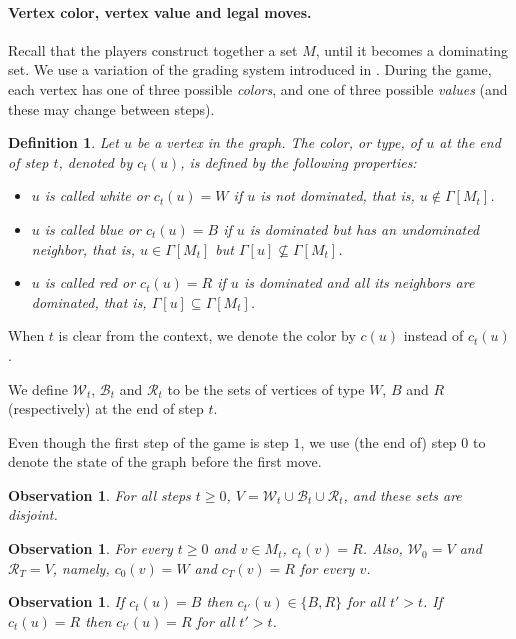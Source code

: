 \documentclass[11pt]{article}
\def\dnsitem{\vspace{-7pt}\item}
\newtheorem{definition}[theorem]{Definition}
\newtheorem{observation}[theorem]{Observation}
\theoremstyle{definition}
\begin{document}
\paragraph{Vertex color, vertex value and legal moves.}
Recall that the players construct together a set $M$, until it becomes a dominating set.
We use a variation of the grading system introduced in \cite{bujtas2015domination}.
During the game, each vertex has one of three possible \emph{colors}, and one of three possible \emph{values} 
(and these may change between steps).

\begin{definition}
Let $u$ be a vertex in the graph.
The \emph{color}, or \emph{type}, of $u$ at the end of step $t$, denoted by $c_t(u)$, is defined by the following properties:
\begin{itemize}
	\dnsitem $u$ is called \emph{white} or $c_t(u) = W$ if $u$ is not dominated, that is, $u \notin \Gamma[M_t]$.
	\dnsitem $u$ is called \emph{blue} or $c_t(u) = B$ if $u$ is dominated but has an undominated neighbor, that is, $u \in \Gamma[M_t]$ but $\Gamma[u] \not\subseteq \Gamma[M_t]$.
	\dnsitem $u$ is called \emph{red} or $c_t(u) = R$ if $u$ is dominated and all its neighbors are dominated, that is, $\Gamma[u] \subseteq \Gamma[M_t]$.
\end{itemize}
\end{definition}

When $t$ is clear from the context, we denote the color by $c(u)$ instead of $c_t(u)$.

We define $\mathcal{W}_t$, $\mathcal{B}_t$ and $\mathcal{R}_t$ to be the sets of vertices of type $W$, $B$ and $R$ (respectively) at the end of step $t$.

Even though the first step of the game is step $1$, we use (the end of) step $0$ to denote the state of the graph before the first move.

\begin{observation}
For all steps $t \geq 0$, $V = \mathcal{W}_t \cup \mathcal{B}_t \cup \mathcal{R}_t$, and these sets are disjoint.
\end{observation}

\begin{observation}
For every $t \geq 0$ and $v \in M_t$, $c_t(v) = R$.
Also, $\mathcal{W}_0 = V$ and $\mathcal{R}_T = V$, namely, $c_0(v) = W$ and $c_T(v) = R$ for every $v$.
\end{observation}

\begin{observation}
If $c_t(u) = B$ then $c_{t'}(u) \in \{B, R\}$ for all $t' > t$.
If $c_t(u) = R$ then $c_{t'}(u) = R$ for all $t' > t$.
\end{observation}
\end{document}
